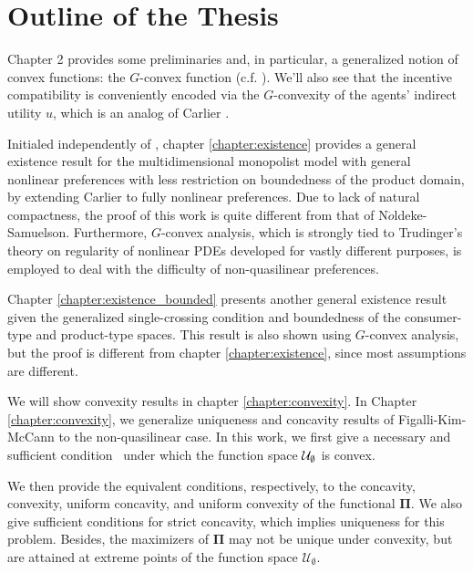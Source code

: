 \section{Outline of the Thesis}


	Chapter 2 provides some preliminaries and, in particular, a generalized notion of convex functions: the $G$-convex function (c.f. \cite{Trudinger14,Balder77,Singer97}).
	We'll also see that the incentive compatibility is conveniently encoded via the  $G$-convexity
	of the agents' indirect utility $u$, which is an analog of Carlier \cite{Carlier01}.
	\medskip

	Initialed independently of \cite{NoldekeSamuelson15p}, chapter \ref{chapter:existence}  provides a general existence result for the multidimensional monopolist model with general nonlinear preferences with less restriction on boundedness of the product domain, {by extending} %
	Carlier \cite{Carlier01} to fully nonlinear preferences. Due to lack of natural compactness, the proof of this work is quite different from that of N$\ddot{o}$ldeke-Samuelson. Furthermore, $G$-convex analysis, which is strongly tied to Trudinger's theory on regularity of nonlinear PDEs \cite{Trudinger14}  developed for vastly different purposes, is employed to deal with the difficulty of non-quasilinear preferences.	
	\medskip



Chapter \ref{chapter:existence_bounded} presents another general existence result given the generalized single-crossing condition and boundedness of the consumer-type and product-type spaces. This result is also shown using $G$-convex analysis, but the proof is different from chapter \ref{chapter:existence}, since most assumptions are different.\medskip


We will show convexity results in chapter \ref{chapter:convexity}. In Chapter \ref{chapter:convexity}, we generalize uniqueness and concavity results of Figalli-Kim-McCann to the non-quasilinear case. In this work, we first give a necessary and sufficient condition \Gthree~under which the function space $\mathcal{U}_{\emptyset}$ is convex. \medskip

We then provide the equivalent conditions, respectively, to the concavity, convexity, uniform concavity, and uniform convexity of the functional $\pmb\Pi$. We also give sufficient conditions for strict concavity, which implies uniqueness for this problem. Besides, the maximizers of $\pmb\Pi$ may not be unique under convexity, but are attained at extreme points of the function space $\mathcal{U}_{\emptyset}$.\medskip 

